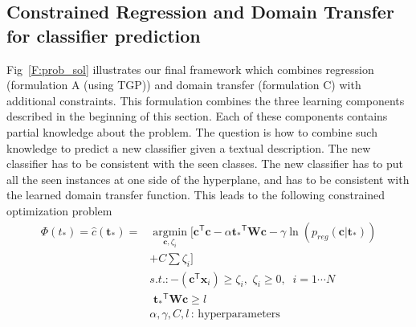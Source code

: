 \subsection{Constrained  Regression and Domain Transfer for classifier prediction}
 Fig~\ref{F:prob_sol} illustrates our final  framework which combines regression (formulation A (using TGP)) and domain transfer (formulation C) with additional constraints. This formulation combines the three learning components described in the beginning of this section. 
Each of these components contains partial knowledge about the problem. The question is how to combine such knowledge to predict a new classifier given a textual description. The new classifier has to be consistent with the seen classes. 
The new classifier has to put all the seen instances at one side of the hyperplane, and has to be consistent with the learned domain transfer function. This leads to the following constrained  optimization problem 
\begin{equation}
\begin{split}
 {\Phi (t_*)} = \hat{c}(\mathbf{t}_*) =  &   \underset{\mathbf{c},\zeta_i}{\operatorname{argmin }}\big[    \mathbf{c}^\textsf{T} \mathbf{c} - \alpha {\mathbf{t}_*}^\textsf{T} \mathbf{W} \mathbf{c}  - \gamma  \ln( p_{reg}(\mathbf{c}|\mathbf{t}_*))  \\
& + C   \sum{\zeta_i} \big]\\
&s.t.:  -(\mathbf{c}^\textsf{T} {\mathbf{x}}_{i} ) \geq \zeta_i ,  \,\, \zeta_i \geq 0 ,\; \; i = 1 \cdots N \\
&	   \,\, {\mathbf{t}_*}^\textsf{T} \mathbf{W} \mathbf{c} \geq l     \\
& \alpha , \gamma, C, l \,  \text{: hyperparameters}\\ 
\end{split}
\label{eq:form}
\end{equation}
